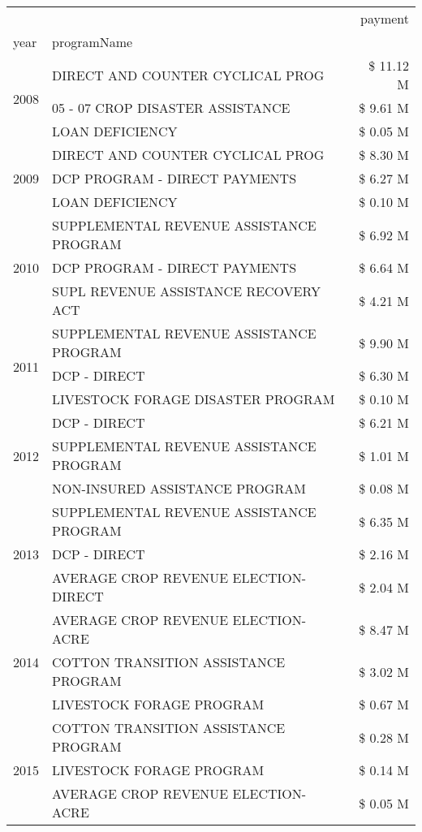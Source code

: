 \begin{tabular}{llr}
\toprule
 &  & payment \\
year & programName &  \\
\midrule
\multirow[t]{3}{*}{2008} & DIRECT AND COUNTER CYCLICAL PROG & \$ 11.12 M \\
 & 05 - 07 CROP DISASTER ASSISTANCE & \$ 9.61 M \\
 & LOAN DEFICIENCY & \$ 0.05 M \\
\cline{1-3}
\multirow[t]{3}{*}{2009} & DIRECT AND COUNTER CYCLICAL PROG & \$ 8.30 M \\
 & DCP PROGRAM - DIRECT PAYMENTS & \$ 6.27 M \\
 & LOAN DEFICIENCY & \$ 0.10 M \\
\cline{1-3}
\multirow[t]{3}{*}{2010} & SUPPLEMENTAL REVENUE ASSISTANCE PROGRAM & \$ 6.92 M \\
 & DCP PROGRAM - DIRECT PAYMENTS & \$ 6.64 M \\
 & SUPL REVENUE ASSISTANCE RECOVERY ACT & \$ 4.21 M \\
\cline{1-3}
\multirow[t]{3}{*}{2011} & SUPPLEMENTAL REVENUE ASSISTANCE PROGRAM & \$ 9.90 M \\
 & DCP - DIRECT & \$ 6.30 M \\
 & LIVESTOCK FORAGE DISASTER PROGRAM & \$ 0.10 M \\
\cline{1-3}
\multirow[t]{3}{*}{2012} & DCP - DIRECT & \$ 6.21 M \\
 & SUPPLEMENTAL REVENUE ASSISTANCE PROGRAM & \$ 1.01 M \\
 & NON-INSURED ASSISTANCE PROGRAM & \$ 0.08 M \\
\cline{1-3}
\multirow[t]{3}{*}{2013} & SUPPLEMENTAL REVENUE ASSISTANCE PROGRAM & \$ 6.35 M \\
 & DCP - DIRECT & \$ 2.16 M \\
 & AVERAGE CROP REVENUE ELECTION-DIRECT & \$ 2.04 M \\
\cline{1-3}
\multirow[t]{3}{*}{2014} & AVERAGE CROP REVENUE ELECTION-ACRE & \$ 8.47 M \\
 & COTTON TRANSITION ASSISTANCE PROGRAM & \$ 3.02 M \\
 & LIVESTOCK FORAGE PROGRAM & \$ 0.67 M \\
\cline{1-3}
\multirow[t]{3}{*}{2015} & COTTON TRANSITION ASSISTANCE PROGRAM & \$ 0.28 M \\
 & LIVESTOCK FORAGE PROGRAM & \$ 0.14 M \\
 & AVERAGE CROP REVENUE ELECTION-ACRE & \$ 0.05 M \\
\cline{1-3}

\end{tabular}
